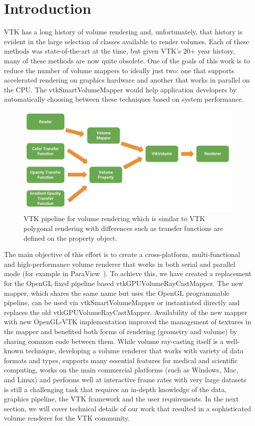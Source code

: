\section{Introduction}
\label{introduction}
VTK has a long history of volume rendering and, unfortunately, that history is
evident in the large selection of classes available to render volumes. Each of
these methods was state-of-the-art at the time, but given VTK’s 20+ year
history, many of these methods are now quite obsolete. One of the goals of this
work is to reduce the number of volume mappers to ideally just two: one that
supports accelerated rendering on graphics hardware and another that works in
parallel on the CPU. The vtkSmartVolumeMapper would help application developers
by automatically choosing between these techniques based on system performance. 

\begin{figure}[ht]
  \centering
  \includegraphics[width=\columnwidth]{vtk_volume_pipeline.pdf}
  \caption{VTK pipeline for volume rendering which is similar to VTK polygonal
    rendering with differences such as transfer functions are defined on the
    property object.}
  \label{fig:pipeline}
\end{figure}%

The main objective of this effort is to create a cross-platform,
multi-functional and high-performance volume renderer that works in both serial
and parallel mode (for example in
ParaView~\citep{ahrens_paraview:_2005,ayachit_paraview_2015}). To achieve this,
we have created a replacement for the OpenGL fixed pipeline based
vtkGPUVolumeRayCastMapper. The new mapper, which shares the same name but uses
the OpenGL programmable pipeline, can be used via vtkSmartVolumeMapper or
instantiated directly and replaces the old vtkGPUVolumeRayCastMapper.
Availability of the new mapper with new OpenGL-VTK implementation improved the
management of textures in the mapper and benefited both forms of rendering
(geometry and volume) by sharing common code between them. While volume
ray-casting itself is a well-known technique, developing a volume renderer that
works with variety of data formats and types, supports many essential features
for medical and scientific computing, works on the main commercial platforms
(such as Windows, Mac, and Linux) and performs well at interactive frame rates
with very large datasets is still a challenging task that requires an in-depth
knowledge of the data, graphics pipeline, the VTK framework and the user
requirements.  In the next section, we will cover technical details of our work
that resulted in a sophisticated volume renderer for the VTK community.
